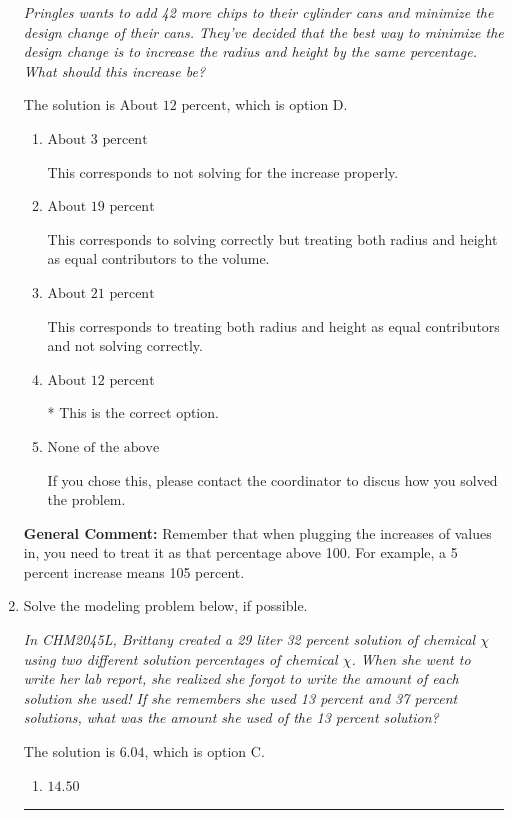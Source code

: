 \documentclass{extbook}[14pt]
\newcommand{\litem}[1]{\item #1

\rule{\textwidth}{0.4pt}}
\begin{document}
\begin{enumerate}
{\begin{center}
    \textit{ Pringles wants to add 42  more chips to their cylinder cans and minimize the design change of their cans. They've decided that the best way to minimize the design change is to increase the radius and height by the same percentage. What should this increase be? }
\end{center}
The solution is \( \text{About } 12 \text{ percent} \), which is option D.\begin{enumerate}[label=\Alph*.]
\item \( \text{About } 3 \text{ percent} \)

This corresponds to not solving for the increase properly.
\item \( \text{About } 19 \text{ percent} \)

This corresponds to solving correctly but treating both radius and height as equal contributors to the volume.
\item \( \text{About } 21 \text{ percent} \)

This corresponds to treating both radius and height as equal contributors and not solving correctly.
\item \( \text{About } 12 \text{ percent} \)

* This is the correct option.
\item \( \text{None of the above} \)

If you chose this, please contact the coordinator to discus how you solved the problem.
\end{enumerate}

\textbf{General Comment:} Remember that when plugging the increases of values in, you need to treat it as that percentage above 100. For example, a 5 percent increase means 105 percent.
}
\litem{
Solve the modeling problem below, if possible.

\begin{center}
    \textit{ In CHM2045L, Brittany created a 29 liter 32 percent solution of chemical $\chi$ using two different solution percentages of chemical $\chi$. When she went to write her lab report, she realized she forgot to write the amount of each solution she used! If she remembers she used 13 percent and 37 percent solutions, what was the amount she used of the 13 percent solution? }
\end{center}
The solution is \( 6.04 \), which is option C.\begin{enumerate}[label=\Alph*.]
\item \( 14.50 \)


\end{enumerate}}
\end{enumerate}
\end{document}
